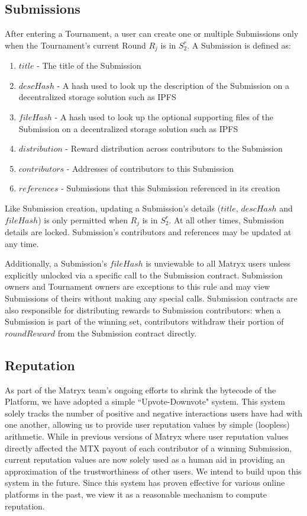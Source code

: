 \documentclass[a4paper, 10pt, conference]{ieeeconf}      %
\begin{document}
\subsection{Submissions}\label{Submissions}

After entering a Tournament, a user can create one or multiple Submissions only when the Tournament's current Round $R_j$ is in $S_{2}^r$. A Submission is defined as:

\begin{enumerate}
\item $title$ - The title of the Submission
\item $descHash$ -  A hash used to look up the description of the Submission on a decentralized storage solution such as IPFS
\item $fileHash$ - A hash used to look up the optional supporting files of the Submission on a decentralized storage solution such as IPFS
\item $distribution$ - Reward distribution across contributors to the Submission
\item $contributors$ - Addresses of contributors to this Submission
\item $references$ - Submissions that this Submission referenced in its creation
\end{enumerate}

Like Submission creation, updating a Submission's details ($title$, $descHash$ and $fileHash$) is only permitted when $R_j$ is in $S_{2}^r$. At all other times, Submission details are locked. Submission's contributors and references may be updated at any time. 

Additionally, a Submission's $fileHash$ is unviewable to all Matryx users unless explicitly unlocked via a specific call to the Submission contract. Submission owners and Tournament owners are exceptions to this rule and may view Submissions of theirs without making any special calls.
Submission contracts are also responsible for distributing rewards to Submission contributors: when a Submission is part of the winning set, contributors withdraw their portion of $roundReward$ from the Submission contract directly.


\subsection{Reputation}\label{reputation}

As part of the Matryx team's ongoing efforts to shrink the bytecode of the Platform, we have adopted a simple ``Upvote-Downvote" system. 
This system solely tracks the number of positive and negative interactions users have had with one another, allowing us to provide user reputation values by simple (loopless) arithmetic. 
While in previous versions of Matryx where user reputation values directly affected the MTX payout of each contributor of a winning Submission, current reputation values are now solely used as a human aid in providing an approximation of the trustworthiness of other users. 
We intend to build upon this system in the future. 
Since this system has proven effective for various online platforms in the past, we view it as a reasonable mechanism to compute reputation.
\end{document}
